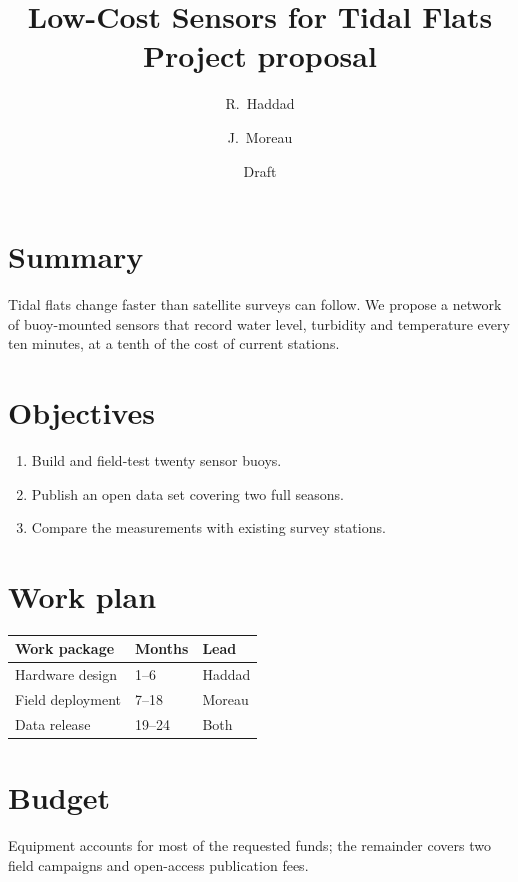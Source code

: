 \documentclass[11pt]{article}
\title{Low-Cost Sensors for Tidal Flats\\\large Project proposal}
\author{R.~Haddad \and J.~Moreau}
\date{Draft}
\begin{document}
\maketitle

\section{Summary}
Tidal flats change faster than satellite surveys can follow. We propose a
network of buoy-mounted sensors that record water level, turbidity and
temperature every ten minutes, at a tenth of the cost of current stations.

\section{Objectives}
\begin{enumerate}
  \item Build and field-test twenty sensor buoys.
  \item Publish an open data set covering two full seasons.
  \item Compare the measurements with existing survey stations.
\end{enumerate}

\section{Work plan}
\begin{center}
\begin{tabular}{lll}
  \toprule
  Work package & Months & Lead \\
  \midrule
  Hardware design & 1--6 & Haddad \\
  Field deployment & 7--18 & Moreau \\
  Data release & 19--24 & Both \\
  \bottomrule
\end{tabular}
\end{center}

\section{Budget}
Equipment accounts for most of the requested funds; the remainder covers
two field campaigns and open-access publication fees.
\end{document}
